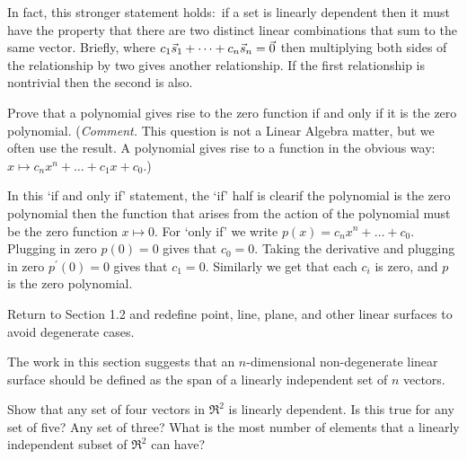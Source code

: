 \begin{exercises}
\begin{answer}
\begin{exparts}
          In fact, this stronger statement holds:~if a set is linearly 
          dependent then it must have the property that there are two 
          distinct linear combinations that sum to the same vector.
          Briefly, where \( c_1\vec{s}_1+\dots+c_n\vec{s}_n=\vec{0} \) then
          multiplying both sides of the relationship by two gives another 
          relationship.
          If the first relationship is nontrivial then the second is also.
      \end{exparts}  
    \end{answer}
  \item  \label{exer:PolyZeroFcnOnlyIfZeroPol}
     Prove that a polynomial gives rise to the zero function if and only if
     it is the zero polynomial.
     (\textit{Comment.}
     This question is not a Linear Algebra matter, but we often use the result.
     A polynomial gives rise to a function in the obvious 
     way:~$x\mapsto c_nx^n+\dots+c_1x+c_0$.)
     \begin{answer}
       In this `if and only if' statement, the `if' half is clear\Dash if 
       the polynomial is the zero polynomial then the function that arises 
       from the action of the polynomial must be the zero 
       function $x\mapsto 0$. 
       For `only if' we write $p(x)=c_nx^n+\dots+c_0$. 
       Plugging in zero $p(0)=0$ gives that $c_0=0$.
       Taking the derivative and plugging in zero $p^\prime(0)=0$ gives 
       that $c_1=0$.
       Similarly we get that each $c_i$ is zero, and $p$ is the zero 
       polynomial.
     \end{answer}
  \item
    Return to Section 1.2 and redefine point, line, plane,
    and other linear surfaces to avoid degenerate cases.
    \begin{answer}
      The work in this section suggests that an \( n \)-dimensional
      non-degenerate linear surface should be defined as the span of a linearly
      independent set of \( n \) vectors.  
    \end{answer}
  \item 
    \begin{exparts}  
      \partsitem Show that any set of four vectors in \( \Re^2 \) is 
         linearly dependent.
      \partsitem Is this true for any set of five?
         Any set of three?
      \partsitem What is the most number of elements that a 
         linearly independent subset of $\Re^2$ can have?
    \end{exparts}
    \begin{answer}

\end{answer}
\end{exercises}
